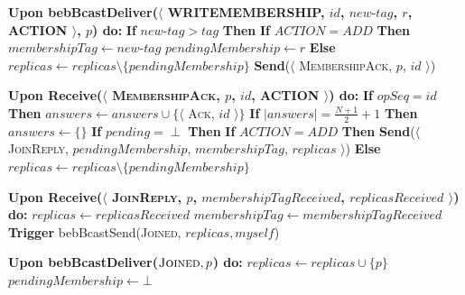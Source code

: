 \documentclass[10pt,a4paper,twocolumn]{article}
\begin{document}
\begin{algorithm}
\begin{algorithmic}
		\State \textbf{Upon bebBcastDeliver($\langle$ WRITEMEMBERSHIP, $id$, $new\text{-}tag$, $r$, ACTION $\rangle$, $p$) do:}
		\State \hspace{1em} \textbf{If} $new\text{-}tag > tag$ \textbf{Then}
		\State \hspace{2em} \textbf{If} $ACTION = ADD$ \textbf{Then}
		\State \hspace{3em} $membershipTag \leftarrow new\text{-}tag$
		\State \hspace{3em} $pendingMembership \leftarrow r$
		\State \hspace{2em} \textbf{Else}
		\State \hspace{3em} $replicas \leftarrow replicas \setminus \{pendingMembership\}$
		\State \hspace{1em} \textbf{Send}($\langle$ \textsc{MembershipAck}, $p$, $id$ $\rangle$)
		\State

		\State \textbf{Upon Receive($\langle$ \textsc{MembershipAck}, $p$, $id$, ACTION $\rangle$) do:}
		\State \hspace{1em} \textbf{If} $opSeq = id$ \textbf{Then}
		\State \hspace{2em} $answers \leftarrow answers \cup \{\langle$ \textsc{Ack}, $id$ $\rangle\}$
		\State \hspace{2em} \textbf{If} $|answers| = \frac{N+1}{2} + 1$ \textbf{Then}
		\State \hspace{3em} $answers \leftarrow \{\}$
		\State \hspace{3em} \textbf{If} $pending = \perp$ \textbf{Then}
		\State \hspace{4em} \textbf{If} $ACTION = ADD$ \textbf{Then}
		\State \hspace{5em} \textbf{Send}($\langle$\textsc{JoinReply}, $pendingMembership$, $membershipTag$, $replicas$ $\rangle$)
		\State \hspace{4em} \textbf{Else}
		\State \hspace{5em} $replicas \leftarrow replicas \setminus \{pendingMembership\}$
		\State

		\State \textbf{Upon Receive($\langle$ \textsc{JoinReply}, $p$, $membershipTagReceived$, $replicasReceived$ $\rangle$) do:}
		\State \hspace{1em} $replicas \leftarrow replicasReceived$
		\State \hspace{1em} $membershipTag \leftarrow membershipTagReceived$
		\State \hspace{1em} \textbf{Trigger} bebBcastSend(\textsc{Joined}, $replicas, myself$)
		\State

		\State \textbf{Upon bebBcastDeliver($ \textsc{Joined}, p$) do:}
		\State \hspace{1em} $replicas \leftarrow replicas \cup \{p\}$
		\State \hspace{1em} $pendingMembership \leftarrow \bot$


	\end{algorithmic}
\end{algorithm}
\end{document}
